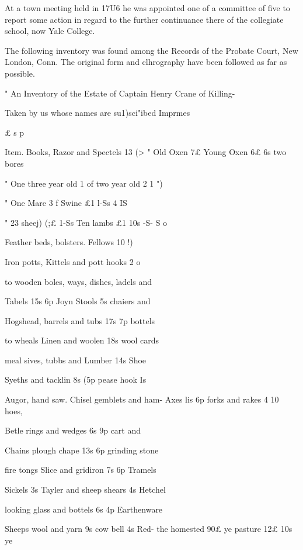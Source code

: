\documentclass[oneside]{book}
\begin{document}
At a town meeting held in 17U6 he was appointed one of a 
committee of five to report some action in regard to the further 
continuance there of the collegiate school, now Yale College. 

The following inventory was found among the Records of the 
Probate Court, New London, Conn. The original form and 
clhrography have been followed as far as possible. 

" An Inventory of the Estate of Captain Henry Crane of Killing- 

Taken by us whose names are su1)sci"ibed 
Imprmes 

£ s p 


Item. Books, Razor and Spectels  13  (> 
" Old Oxen 7£ Young Oxen 6£  6s two bores 


" One three year old 1 of two year old 2  1 ")  

" One Mare 3 f Swine £1  l-Ss 4  IS  

" 23 sheej) (;£ 1-Ss Ten lambs £1 10s -S- S o 

Feather beds, bolsters. Fellows 10  !)  










Iron potts, Kittels and pott hooks 2  o  





to wooden boles, ways, dishes, ladels and 


Tabels 15s  6p Joyn Stools 5s chaiers and 

Hogshead, barrels and tubs 17s  7p bottels 



to wheals Linen and woolen 18s wool cards 

meal sives, tubbs and Lumber 14s Shoe 

Syeths and tacklin 8s  (5p pease hook Is 

Augor, hand saw. Chisel gemblets and ham- 
Axes lis  6p forks and rakes 4  10 hoes, 

Betle rings and wedges 6s  9p cart and 


Chains plough chape 13s  6p grinding stone 


fire tongs Slice and gridiron 7s  6p Tramels 

Sickels 3s Tayler and sheep shears 4s Hetchel 


looking glass and bottels 6s  4p Earthenware 

Sheeps wool and yarn 9s cow bell 4s Red- 
the homested 90£ ye pasture 12£  10s ye 
\end{document}
